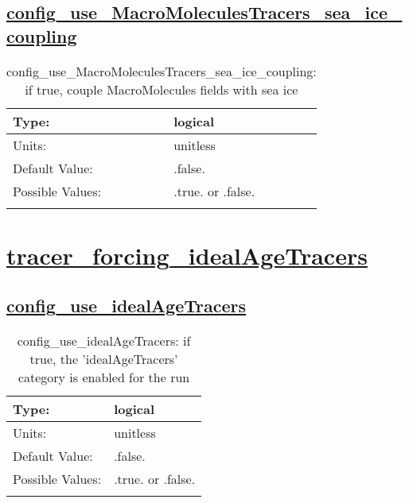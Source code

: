 \subsection[config\_use\_MacroMoleculesTracers\_sea\_ice\_coupling]{\hyperref[sec:nm_tab_tracer_forcing_MacroMoleculesTracers]{config\_use\_MacroMoleculesTracers\_sea\_ice\_coupling}}
\label{subsec:nm_sec_config_use_MacroMoleculesTracers_sea_ice_coupling}
\begin{center}
\begin{longtable}{| p{2.0in} || p{4.0in} |}
    \hline
    Type: & logical \\
    \hline
    Units: & \si{unitless} \\
    \hline
    Default Value: & .false. \\
    \hline
    Possible Values: & .true. or .false. \\
    \hline
    \caption{config\_use\_MacroMoleculesTracers\_sea\_ice\_coupling: if true, couple MacroMolecules fields with sea ice}
\end{longtable}
\end{center}
\section[tracer\_forcing\_idealAgeTracers]{\hyperref[sec:nm_tab_tracer_forcing_idealAgeTracers]{tracer\_forcing\_idealAgeTracers}}
\label{sec:nm_sec_tracer_forcing_idealAgeTracers}
\subsection[config\_use\_idealAgeTracers]{\hyperref[sec:nm_tab_tracer_forcing_idealAgeTracers]{config\_use\_idealAgeTracers}}
\label{subsec:nm_sec_config_use_idealAgeTracers}
\begin{center}
\begin{longtable}{| p{2.0in} || p{4.0in} |}
    \hline
    Type: & logical \\
    \hline
    Units: & \si{unitless} \\
    \hline
    Default Value: & .false. \\
    \hline
    Possible Values: & .true. or .false. \\
    \hline
    \caption{config\_use\_idealAgeTracers: if true, the 'idealAgeTracers' category is enabled for the run}
\end{longtable}
\end{center}
